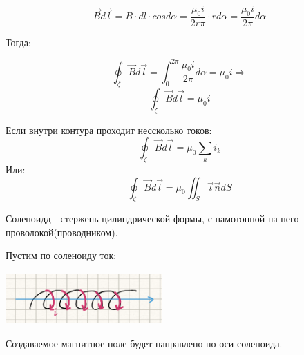 \documentclass[../main.tex]{subfiles}
\begin{document}
\[\vec B d \vec l = B \cdot dl \cdot cos{d \alpha} = \frac{\mu_0 i}{2r \pi} \cdot r d \alpha = \frac{\mu_0 i}{2 \pi} d \alpha\]

Тогда:

\[\oint_{\zeta} \vec B d \vec l = \int_{0}^{2 \pi} \frac{\mu_0 i}{2 \pi} d \alpha = \mu_0 i \Rightarrow \]
\[\oint_{\zeta} \vec B d \vec l = \mu_0 i\]

Если внутри контура проходит нессколько токов:
\[\oint_{\zeta} \vec B d \vec l = \mu_0 \sum_{k} i_k\]
Или:
\[\oint_{\zeta} \vec B d \vec l = \mu_0 \iint_{S} \vec \iota  \vec n dS\]

 Соленоидд - стержень цилиндрической формы, с намотонной на него проволокой(проводником).

Пустим по соленоиду ток:
\begin{center}
    \includegraphics[width=6cm, height=2cm]{../img/soly.png}
\end{center}


Создаваемое магнитное поле будет направлено по оси соленоида.
\end{document}
